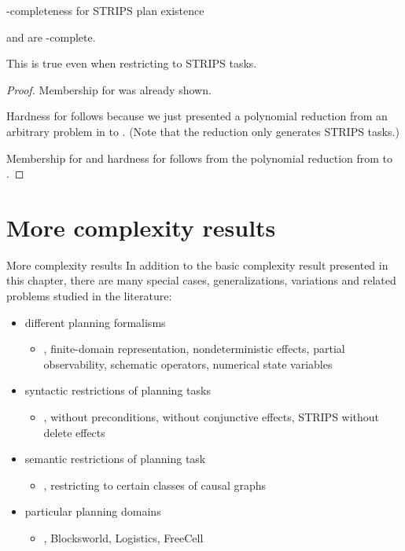\documentclass{gkibeamer}
\begin{document}
\begin{frame}{\pspace-completeness for STRIPS plan existence}
  \begin{theorem}
    {\planex} and {\planlen} are \pspace-complete.

    This is true even when restricting to STRIPS tasks.
  \end{theorem}

  \begin{proof}
    Membership for {\planlen} was already shown.

    \smallskip

    Hardness for {\planex} follows because we just presented a
    polynomial reduction from an arbitrary problem in {\pspace} to
    {\planex}. (Note that the reduction only generates STRIPS tasks.)

    \smallskip

    Membership for {\planex} and hardness for {\planlen} follows from
    the polynomial reduction from {\planex} to {\planlen}.
  \end{proof}
\end{frame}

\section{More complexity results}

\begin{frame}{More complexity results}
  In addition to the basic complexity result presented in this
  chapter, there are many special cases, generalizations, variations
  and related problems studied in the literature:

  \begin{itemize}
  \item different \alert{planning formalisms}
    \begin{itemize}
    \item \eg, finite-domain representation, nondeterministic effects,
      partial observability, schematic operators, numerical state
      variables
    \end{itemize}
  \item \alert{syntactic restrictions} of planning tasks
    \begin{itemize}
    \item \eg, without preconditions, without conjunctive effects,
      STRIPS without delete effects
    \end{itemize}
  \item \alert{semantic restrictions} of planning task
    \begin{itemize}
    \item \eg, restricting to certain classes of causal graphs
    \end{itemize}
  \item \alert{particular planning domains}
    \begin{itemize}
    \item \eg, Blocksworld, Logistics, FreeCell
    \end{itemize}
  \end{itemize}
\end{frame}
\end{document}
